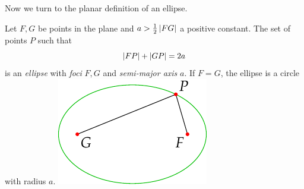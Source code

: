 Now we turn to the planar definition of an ellipse.

\begin{defn}[lower separated=false, sidebyside, sidebyside align=top seam, sidebyside gap=0pt, righthand width=0.35\linewidth]{}{}
Let $F,G$ be points in the plane and $a>\frac 12\left| FG\right|$ a positive constant. The set of points $P$ such that
\[\left| FP\right|+\left| GP\right|=2a\]
is an \emph{ellipse} with \emph{foci} $F,G$ and \emph{semi-major axis} $a$. If $F=G$, the ellipse is a circle with radius $a$.
\tcblower
\flushright\includegraphics{ellipse1}
\end{defn}


